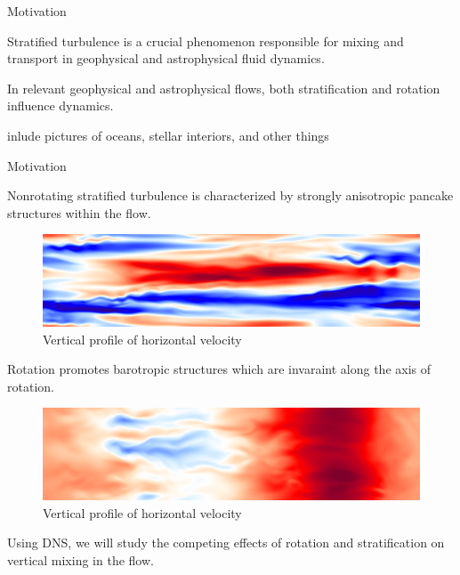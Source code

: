 \documentclass{beamer}
\begin{document}
\begin{frame}{Motivation}

\begin{itemize}
{\small
\item Stratified turbulence is a crucial phenomenon responsible for mixing and
transport in geophysical and astrophysical fluid dynamics. 

\item In relevant geophysical and astrophysical flows, both stratification and
rotation influence dynamics. 
} %
\end{itemize}

inlude pictures of oceans, stellar interiors, and other things

\end{frame}







\begin{frame}{Motivation}
    {\footnotesize
    Nonrotating stratified turbulence is characterized by strongly
    anisotropic pancake structures within the flow. 

    \begin{figure}
        \centering
        \includegraphics[width=.9\textwidth]{images/uB100XZSlice.png}
        \caption*{\scriptsize Vertical profile of horizontal velocity}
    \end{figure}
    } %
\emp
\hspace{6pt}
    {\footnotesize
    Rotation promotes barotropic structures which are invaraint along the axis
    of rotation.
    
    \begin{figure}
        \centering
        \includegraphics[width=.9\textwidth]{images/XZOm2ux.png}
        \caption*{\scriptsize Vertical profile of horizontal velocity}
    \end{figure}
    } %
\emp

\vspace{10pt}

Using DNS, we will study the competing effects of rotation and
stratification on vertical mixing in the flow. 

\end{frame}
\end{document}
